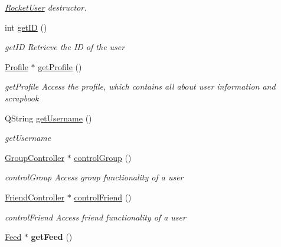 \begin{DoxyCompactItemize}
\begin{DoxyCompactList}\small\item\em \hyperlink{classRocketUser}{Rocket\+User} destructor. \end{DoxyCompactList}\item 
int \hyperlink{classRocketUser_a435c19898ebb866ee35fa10b3eadd212}{get\+ID} ()
\begin{DoxyCompactList}\small\item\em get\+ID Retrieve the ID of the user \end{DoxyCompactList}\item 
\hyperlink{classProfile}{Profile} $\ast$ \hyperlink{classRocketUser_a788ee5a45c37ba10fa71e684a3144d8c}{get\+Profile} ()
\begin{DoxyCompactList}\small\item\em get\+Profile Access the profile, which contains all about user information and scrapbook \end{DoxyCompactList}\item 
Q\+String \hyperlink{classRocketUser_a6c090361254679565787368e391ba81c}{get\+Username} ()
\begin{DoxyCompactList}\small\item\em get\+Username \end{DoxyCompactList}\item 
\hyperlink{classGroupController}{Group\+Controller} $\ast$ \hyperlink{classRocketUser_ae0e3021b9fcc002e4608747076527819}{control\+Group} ()
\begin{DoxyCompactList}\small\item\em control\+Group Access group functionality of a user \end{DoxyCompactList}\item 
\hyperlink{classFriendController}{Friend\+Controller} $\ast$ \hyperlink{classRocketUser_aface2ba08248ebd171c663af5d80b330}{control\+Friend} ()
\begin{DoxyCompactList}\small\item\em control\+Friend Access friend functionality of a user \end{DoxyCompactList}\item 
\hyperlink{classFeed}{Feed} $\ast$ {\bfseries get\+Feed} ()\hypertarget{classRocketUser_aae8d411133e60b27321f27b4f30abcb8}{}\label{classRocketUser_aae8d411133e60b27321f27b4f30abcb8}


\end{DoxyCompactItemize}
